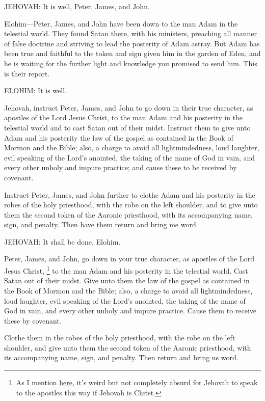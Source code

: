 			JEHOVAH: It is well, Peter, James, and John.

			Elohim---Peter, James, and John have been down to the man Adam in the telestial world. They found Satan there, with his ministers, preaching all manner of false doctrine and striving to lead the posterity of Adam astray. But Adam has been true and faithful to the token and sign given him in the garden of Eden, and he is waiting for the further light and knowledge you promised to send him. This is their report.

			ELOHIM: It is well.

			Jehovah, instruct Peter, James, and John to go down in their true character, as apostles of the Lord Jesus Christ, to the man Adam and his posterity in the telestial world and to cast Satan out of their midst. Instruct them to give unto Adam and his posterity the law of the gospel as contained in the Book of Mormon and the Bible; also, a charge to avoid all lightmindedness, loud laughter, evil speaking of the Lord's anointed, the taking of the name of God in vain, and every other unholy and impure practice; and cause these to be received by covenant.

			Instruct Peter, James, and John further to clothe Adam and his posterity in the robes of the holy priesthood, with the robe on the left shoulder, and to give unto them the second token of the Aaronic priesthood, with its accompanying name, sign, and penalty. Then have them return and bring me word.

			JEHOVAH: It shall be done, Elohim.

			Peter, James, and John, go down in your true character, as apostles of the Lord Jesus Christ,%
				\footnote{%
					\label{ENDOWMENT-character}%
					As I mention \hyperref[ADAMGOD-TEMPLE]{here}, it's weird but not completely absurd for Jehovah to speak to the apostles this way if Jehovah is Christ.
					}
			to the man Adam and his posterity in the telestial world. Cast Satan out of their midst. Give unto them the law of the gospel as contained in the Book of Mormon and the Bible; also, a charge to avoid all lightmindedness, loud laughter, evil speaking of the Lord's anointed, the taking of the name of God in vain, and every other unholy and impure practice. Cause them to receive these by covenant.

			Clothe them in the robes of the holy priesthood, with the robe on the left shoulder, and give unto them the second token of the Aaronic priesthood, with its accompanying name, sign, and penalty. Then return and bring us word.

